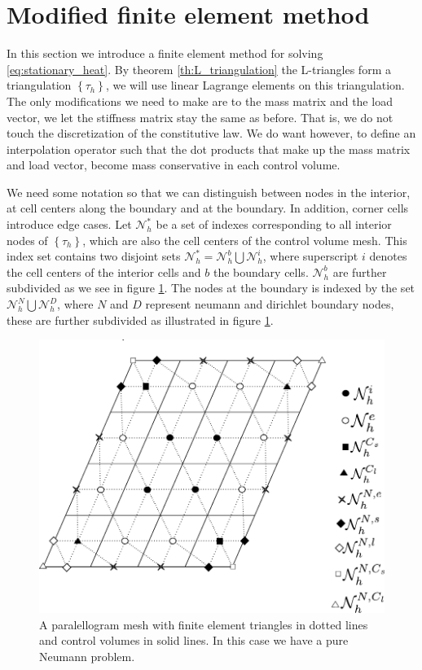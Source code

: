 \documentclass[../Main/main.tex]{subfiles}
\begin{document}
	\section{Modified finite element method}
	In this section we introduce a finite element method for solving \eqref{eq:stationary_heat}. By theorem \ref{th:L_triangulation} the L-triangles form a triangulation $\left \{ \tau_h \right \}$, we will use linear Lagrange elements on this triangulation. The only modifications we need to make are to the mass matrix and the load vector, we let the stiffness matrix stay the same as before. That is, we do not touch the discretization of the constitutive law. We do want however, to define an interpolation operator such that the dot products that make up the mass matrix and load vector, become mass conservative in each control volume. 
	\par
	We need some notation so that we can distinguish between nodes in the interior, at cell centers along the boundary and at the boundary. In addition, corner cells introduce edge cases. 
	Let $\mathcal{N}_h^*$ be a set of indexes corresponding to all interior nodes of $\left \{ \tau_h \right \}$, which are also the cell centers of the control volume mesh. This index set contains two disjoint sets $\mathcal{N}_h^* = \mathcal{N}_h^b \bigcup \mathcal{N}_h^i$, where superscript $i$ denotes the cell centers of the interior cells and $b$ the boundary cells. $\mathcal{N}^b_h$ are further subdivided as we see in figure \ref{fig:mesWithNodes}. The nodes at the boundary is indexed by the set $\mathcal{N}_h^N \bigcup \mathcal{N}_h^D$, where $N$ and $D$ represent neumann and dirichlet boundary nodes, these are further subdivided as illustrated in figure \ref{fig:mesWithNodes}.
	\begin{figure}[H]
		\centering
		\includegraphics{meshWithNodes.pdf}

		\caption{A paralellogram mesh with finite element triangles in dotted lines and control volumes in solid lines. In this case we have a pure Neumann problem.}
		\label{fig:mesWithNodes}
	\end{figure}
\end{document}
